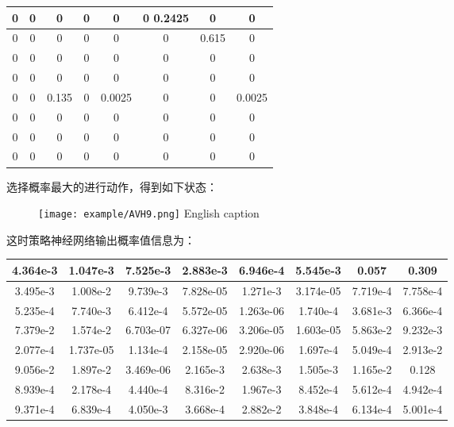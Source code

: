 \begin{tabular}{|c|c|c|c|c|c|c|c|}
	\hline 
	0& 0 & 0 &0  & 0 &0 0.2425 & 0 &0  \\ 
	\hline 
	0 & 0 & 0 & 0 & 0 & 0 & 0.615 & 0 \\ 
	\hline 
	0 & 0 & 0 & 0 & 0 & 0 & 0 & 0 \\ 
	\hline 
	0 & 0 & 0 & 0 & 0& 0 & 0 & 0 \\ 
	\hline 
	0 & 0 & 0.135 & 0 & 0.0025 & 0 & 0 & 0.0025 \\ 
	\hline 
	0 & 0 & 0 & 0 & 0 & 0 & 0 & 0 \\ 
	\hline 
	0 & 0 & 0 & 0 & 0 & 0 & 0 & 0 \\ 
	\hline 
	0 & 0 & 0 & 0 & 0 & 0 & 0 & 0 \\ 
	\hline 
\end{tabular}

选择概率最大的进行动作，得到如下状态：

\begin{figure}[!htp]
	\centering
	\texttt{[image: example/AVH9.png]}
	\hspace{0.5cm}
	{English caption}
	\label{fig:human5}
\end{figure}

这时策略神经网络输出概率值信息为：

\begin{tabular}{|c|c|c|c|c|c|c|c|}
	\hline 
	4.364e-3 & 1.047e-3 & 7.525e-3 & 2.883e-3 & 6.946e-4 & 5.545e-3 & 0.057 & 0.309 \\ 
	\hline 
	3.495e-3 & 1.008e-2 & 9.739e-3 & 7.828e-05 & 1.271e-3 & 3.174e-05 & 7.719e-4 & 7.758e-4 \\ 
	\hline 
	5.235e-4 & 7.740e-3 & 6.412e-4 & 5.572e-05 & 1.263e-06 & 1.740e-4 & 3.681e-3 & 6.366e-4 \\ 
	\hline 
	7.379e-2 & 1.574e-2 & 6.703e-07 & 6.327e-06 & 3.206e-05 & 1.603e-05 & 5.863e-2 & 9.232e-3 \\ 
	\hline 
	2.077e-4 & 1.737e-05 & 1.134e-4 & 2.158e-05 & 2.920e-06 & 1.697e-4 & 5.049e-4 & 2.913e-2 \\ 
	\hline 
	9.056e-2 & 1.897e-2 & 3.469e-06 & 2.165e-3 & 2.638e-3 & 1.505e-3 & 1.165e-2 & 0.128 \\ 
	\hline 
	8.939e-4 & 2.178e-4 & 4.440e-4 & 8.316e-2 & 1.967e-3 & 8.452e-4 & 5.612e-4 & 4.942e-4 \\ 
	\hline 
	9.371e-4 & 6.839e-4 & 4.050e-3 & 3.668e-4 & 2.882e-2 & 3.848e-4 & 6.134e-4 &5.001e-4 \\ 
	\hline 
\end{tabular} 

